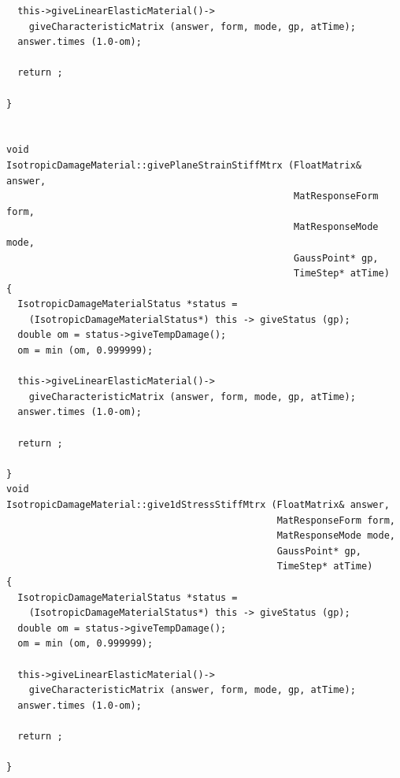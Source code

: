 \documentclass[a4paper]{article}
\begin{document}
{\begin{verbatim}
  this->giveLinearElasticMaterial()->
    giveCharacteristicMatrix (answer, form, mode, gp, atTime);
  answer.times (1.0-om);

  return ;
  
}


void 
IsotropicDamageMaterial::givePlaneStrainStiffMtrx (FloatMatrix& answer, 
                                                   MatResponseForm form,
                                                   MatResponseMode mode,
                                                   GaussPoint* gp, 
                                                   TimeStep* atTime)
{
  IsotropicDamageMaterialStatus *status = 
    (IsotropicDamageMaterialStatus*) this -> giveStatus (gp);
  double om = status->giveTempDamage();
  om = min (om, 0.999999);

  this->giveLinearElasticMaterial()->
    giveCharacteristicMatrix (answer, form, mode, gp, atTime);
  answer.times (1.0-om);

  return ;

}
void 
IsotropicDamageMaterial::give1dStressStiffMtrx (FloatMatrix& answer, 
                                                MatResponseForm form,
                                                MatResponseMode mode,
                                                GaussPoint* gp, 
                                                TimeStep* atTime)
{
  IsotropicDamageMaterialStatus *status = 
    (IsotropicDamageMaterialStatus*) this -> giveStatus (gp);
  double om = status->giveTempDamage();
  om = min (om, 0.999999);

  this->giveLinearElasticMaterial()->
    giveCharacteristicMatrix (answer, form, mode, gp, atTime);
  answer.times (1.0-om);

  return ;

}

\end{verbatim}}
\end{document}
